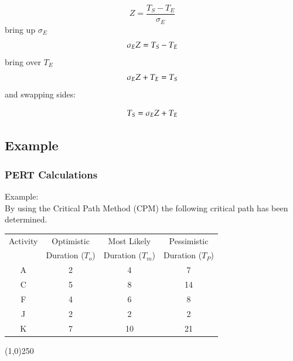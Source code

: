 \begin{equation}
Z =\frac{T_{S}-T_{E}}{\sigma_E} 
\end{equation}
bring up $\sigma_E$ \notag
\begin{equation}
\sigma_{E}Z =T_{S}-T_{E} \notag
\end{equation}
bring over $T_E$
\begin{equation}
\sigma_{E}Z + T_{E} = T_{S} \notag
\end{equation}
and swapping sides:

\begin{equation}
 T_{S} =\sigma_{E}Z + T_{E} \notag
\end{equation}


\subsection{Example}

\begin{frame}
\frametitle{PERT Calculations}
Example:\\
By using the Critical Path Method (CPM) the following critical path has been determined.


\begin{table}
	\centering
		\begin{tabular}{|c|c|c|c|}
		\hline
		Activity 	& 	Optimistic 		 & 	Most Likely  	& 	Pessimistic \\
			  		&	Duration ($T_o$) &	Duration ($T_m$)&	Duration ($T_P$)\\
		\hline
		A & 2 & 4 & 7 \\		
		C & 5 & 8 & 14 \\
		F & 4 & 6 & 8 \\
		J & 2 & 2 & 2 \\
		K & 7 & 10 & 21 \\
		\hline
		\end{tabular}
\end{table}
\end{frame}
\begin{center}\line(1,0){250}\end{center}



